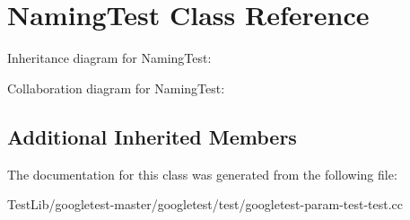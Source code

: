\hypertarget{classNamingTest}{}\section{Naming\+Test Class Reference}
\label{classNamingTest}


Inheritance diagram for Naming\+Test\+:


Collaboration diagram for Naming\+Test\+:
\subsection*{Additional Inherited Members}


The documentation for this class was generated from the following file\+:\begin{DoxyCompactItemize}
\item 
Test\+Lib/googletest-\/master/googletest/test/googletest-\/param-\/test-\/test.\+cc\end{DoxyCompactItemize}
